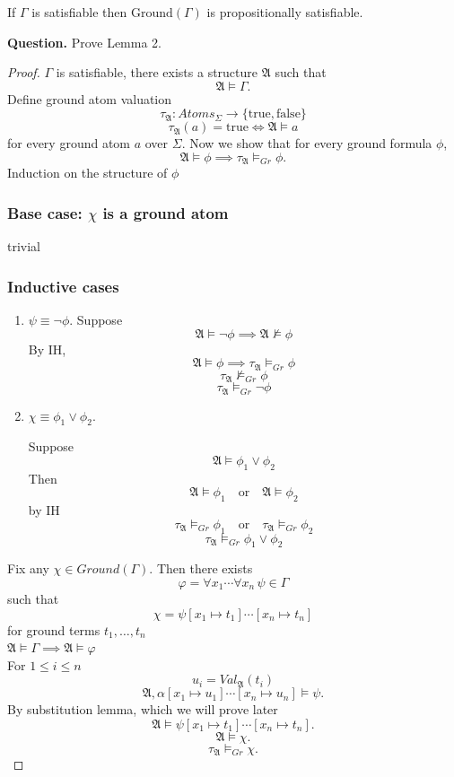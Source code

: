 \documentclass{article}
\newtheorem{lemma}[theorem]{Lemma}
\let\oldlemma\lemma
\let\endoldlemma\endlemma
\renewenvironment{lemma}
  {\begin{tcolorbox}[
      colback=green!8,
      colframe=green!50!black,
      boxrule=0.6pt,
      arc=2pt,
      left=6pt,right=6pt,top=4pt,bottom=4pt
    ]\oldlemma}
  {\endoldlemma\end{tcolorbox}}
\begin{document}
\begin{lemma}
If $\Gamma$ is satisfiable then $\mathrm{Ground}(\Gamma)$ is propositionally satisfiable.
\end{lemma}

\textbf{Question.} Prove Lemma 2.
\begin{proof}
    $\Gamma$ is satisfiable, there exists a structure $\mathfrak A$ such that
    \[
    \mathfrak A \models \Gamma.
    \]
    Define ground atom valuation
    \[
    \tau_{\mathfrak A} : Atoms_\Sigma \to \{\mathrm{true},\mathrm{false}\}
    \]
    \[
    \tau_{\mathfrak A}(a)=\mathrm{true}
    \iff
    \mathfrak A \models a
    \]
    for every ground atom $a$ over $\Sigma$.
    Now we show that for every ground formula $\phi$,
    \[
    \mathfrak A \models \phi \implies \tau_{\mathfrak A}\models_{Gr}\phi.
    \]
    Induction on the structure of $\phi$    
    \subsubsection*{Base case: $\chi$ is a ground atom}
    trivial    
    \subsubsection*{Inductive cases}
    \begin{enumerate}
        \item $\psi \equiv \neg \phi$.
        Suppose
        \[
        \mathfrak A \models \neg \phi \implies
        \mathfrak A \not\models \phi
        \]
        By IH,
        \[
        \mathfrak A \models \phi \implies \tau_{\mathfrak A}\models_{Gr}\phi
        \]
        \[
        \tau_{\mathfrak A}\not\models_{Gr}\phi
        \]
        \[
        \tau_{\mathfrak A}\models_{Gr}\neg\phi
        \]
    
        \item $\chi \equiv \phi_1 \lor \phi_2$.
    
        Suppose
        \[
        \mathfrak A \models \phi_1 \lor \phi_2
        \]
        Then 
        \[
        \mathfrak A \models \phi_1
        \quad\text{or}\quad
        \mathfrak A \models \phi_2
        \]
        by IH
        \[
        \tau_{\mathfrak A}\models_{Gr}\phi_1
        \quad\text{or}\quad
        \tau_{\mathfrak A}\models_{Gr}\phi_2
        \]
        \[
        \tau_{\mathfrak A}\models_{Gr}\phi_1 \lor \phi_2
        \]
    \end{enumerate}
    Fix any $\chi \in Ground(\Gamma)$. Then there exists
    \[
    \varphi=\forall x_1\cdots\forall x_n\,\psi \in \Gamma
    \]
    such that
    \[
    \chi=\psi[x_1\mapsto t_1]\cdots[x_n\mapsto t_n]
    \]
    for ground terms $t_1,\dots,t_n$\\
    $\mathfrak A \models \Gamma \implies \mathfrak A \models \varphi$\\
    For $1 \leq i \leq n$
    \[
    u_i = Val_{\mathfrak A}(t_i)
    \]
    \[
    \mathfrak A,\alpha[x_1\mapsto u_1]\cdots[x_n\mapsto u_n]\models \psi.
    \]
    By substitution lemma, which we will prove later
    \[
    \mathfrak A \models \psi[x_1\mapsto t_1]\cdots[x_n\mapsto t_n].
    \]
    \[
    \mathfrak A \models \chi.
    \]
    \[
    \tau_{\mathfrak A}\models_{Gr}\chi.
    \]
    

\end{proof}
\end{document}
